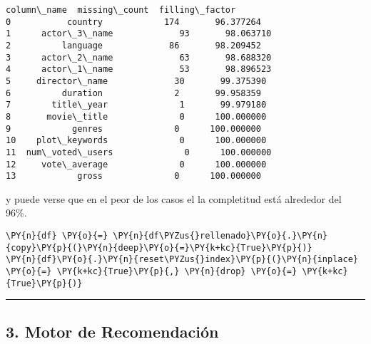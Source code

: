             \begin{tcolorbox}[breakable, size=fbox, boxrule=.5pt, pad at break*=1mm, opacityfill=0]
\begin{Verbatim}[commandchars=\\\{\}]
        column\_name  missing\_count  filling\_factor
0           country            174       96.377264
1      actor\_3\_name             93       98.063710
2          language             86       98.209452
3      actor\_2\_name             63       98.688320
4      actor\_1\_name             53       98.896523
5     director\_name             30       99.375390
6          duration              2       99.958359
7        title\_year              1       99.979180
8       movie\_title              0      100.000000
9            genres              0      100.000000
10    plot\_keywords              0      100.000000
11  num\_voted\_users              0      100.000000
12     vote\_average              0      100.000000
13            gross              0      100.000000
\end{Verbatim}
\end{tcolorbox}
        
    y puede verse que en el peor de los casos el la completitud está
alrededor del 96\%.

    \begin{tcolorbox}[breakable, size=fbox, boxrule=1pt, pad at break*=1mm,colback=cellbackground, colframe=cellborder]
\begin{Verbatim}[commandchars=\\\{\}]
\PY{n}{df} \PY{o}{=} \PY{n}{df\PYZus{}rellenado}\PY{o}{.}\PY{n}{copy}\PY{p}{(}\PY{n}{deep}\PY{o}{=}\PY{k+kc}{True}\PY{p}{)}
\PY{n}{df}\PY{o}{.}\PY{n}{reset\PYZus{}index}\PY{p}{(}\PY{n}{inplace} \PY{o}{=} \PY{k+kc}{True}\PY{p}{,} \PY{n}{drop} \PY{o}{=} \PY{k+kc}{True}\PY{p}{)}
\end{Verbatim}
\end{tcolorbox}

    \begin{center}\rule{0.5\linewidth}{0.5pt}\end{center}

\hypertarget{motor-de-recomendaciuxf3n}{%
\subsection{3. Motor de Recomendación}\label{motor-de-recomendaciuxf3n}}

